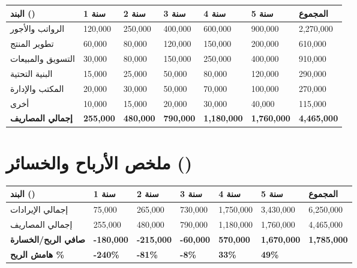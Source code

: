 \documentclass[11pt,a4paper,landscape]{article}
\begin{document}
\begin{table}[H]
\centering
\footnotesize
\renewcommand{\arraystretch}{1.4}
\begin{tabularx}{\textwidth}{L{5cm} R{2.5cm} R{2.5cm} R{2.5cm} R{2.5cm} R{2.5cm} R{2.5cm}}
\toprule
\textbf{البند ()} & \textbf{سنة 1} & \textbf{سنة 2} & \textbf{سنة 3} & \textbf{سنة 4} & \textbf{سنة 5} & \textbf{المجموع} \\
\midrule
{}
الرواتب والأجور & 120,000 & 250,000 & 400,000 & 600,000 & 900,000 & 2,270,000 \\
تطوير المنتج & 60,000 & 80,000 & 120,000 & 150,000 & 200,000 & 610,000 \\
التسويق والمبيعات & 30,000 & 80,000 & 150,000 & 250,000 & 400,000 & 910,000 \\
البنية التحتية & 15,000 & 25,000 & 50,000 & 80,000 & 120,000 & 290,000 \\
المكتب والإدارة & 20,000 & 30,000 & 50,000 & 70,000 & 100,000 & 270,000 \\
أخرى & 10,000 & 15,000 & 20,000 & 30,000 & 40,000 & 115,000 \\
\midrule
\textbf{إجمالي المصاريف} & \textbf{255,000} & \textbf{480,000} & \textbf{790,000} & \textbf{1,180,000} & \textbf{1,760,000} & \textbf{4,465,000} \\
\bottomrule
\end{tabularx}
\end{table}

\section{ملخص الأرباح والخسائر ()}
\label{sec:pnl}

\begin{table}[H]
\centering
\footnotesize
\renewcommand{\arraystretch}{1.4}
\begin{tabularx}{\textwidth}{L{5cm} R{2.5cm} R{2.5cm} R{2.5cm} R{2.5cm} R{2.5cm} R{2.5cm}}
\toprule
\textbf{البند ()} & \textbf{سنة 1} & \textbf{سنة 2} & \textbf{سنة 3} & \textbf{سنة 4} & \textbf{سنة 5} & \textbf{المجموع} \\
\midrule
{}
إجمالي الإيرادات & 75,000 & 265,000 & 730,000 & 1,750,000 & 3,430,000 & 6,250,000 \\
إجمالي المصاريف & 255,000 & 480,000 & 790,000 & 1,180,000 & 1,760,000 & 4,465,000 \\
\midrule
{}
\textbf{صافي الربح/الخسارة} & \textbf{-180,000} & \textbf{-215,000} & \textbf{-60,000} & \textbf{570,000} & \textbf{1,670,000} & \textbf{1,785,000} \\
\textbf{هامش الربح \%} & \textbf{-240\%} & \textbf{-81\%} & \textbf{-8\%} & \textbf{33\%} & \textbf{49\%} & \\
\bottomrule
\end{tabularx}
\end{table}
\end{document}
